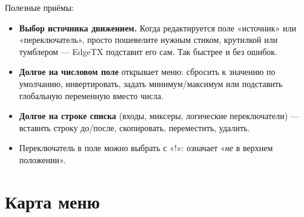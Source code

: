 Полезные приёмы:
\begin{itemize}
  \item \textbf{Выбор источника движением.} Когда редактируется поле «источник» или
        «переключатель», просто пошевелите нужным стиком, крутилкой или тумблером --- EdgeTX
        подставит его сам. Так быстрее и без ошибок.
  \item \textbf{Долгое  на числовом поле} открывает меню: сбросить к значению
        по умолчанию, инвертировать, задать минимум/максимум или подставить глобальную
        переменную  вместо числа.
  \item \textbf{Долгое  на строке списка} (входы, миксеры, логические переключатели)
        --- вставить строку до/после, скопировать, переместить, удалить.
  \item Переключатель в поле  можно выбрать с «!»:  означает
        «\emph{не} в верхнем положении».
\end{itemize}

\section{Карта меню}

